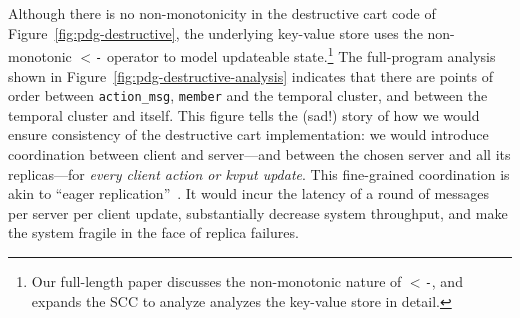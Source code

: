 

Although there is no
non-monotonicity in the destructive
cart code of Figure~\ref{fig:pdg-destructive}, the underlying key-value store uses the non-monotonic \texttt{$<$-} operator to model updateable state.\footnote{Our full-length paper discusses the non-monotonic nature of \texttt{$<$-}, and
expands the SCC to analyze analyzes the key-value store in detail.}
The full-program analysis shown in Figure~\ref{fig:pdg-destructive-analysis}
indicates that there are
points of order between \texttt{action\_msg}, \texttt{member} and the temporal cluster,
and between the temporal cluster and itself.
This figure tells the (sad!) story of how we would ensure consistency of the destructive cart implementation: we would introduce coordination
between client and server---and between the chosen server and all its replicas---for {\em every client action or kvput update}.  This fine-grained coordination is akin to ``eager replication''~\cite{dangers}. It would incur the latency of a round of messages per server per client update, substantially decrease system throughput, and make the system fragile in the face of replica failures.

